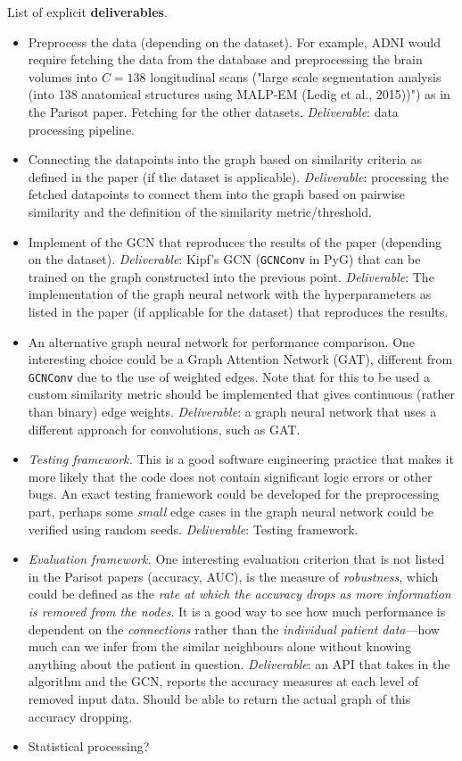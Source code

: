 \documentclass[12pt,a4paper,twoside]{article}
\begin{document}
List of explicit \textbf{deliverables}.
\begin{itemize}
  \item Preprocess the data (depending on the dataset). For example, ADNI would require fetching the data from the database and preprocessing the brain volumes into $C=138$ longitudinal scans ("large scale segmentation analysis (into 138 anatomical structures using MALP-EM (Ledig et al., 2015))") as in the Parisot paper. Fetching for the other datasets. \textit{Deliverable}: data processing pipeline.
  \item Connecting the datapoints into the graph based on similarity criteria as defined in the paper (if the dataset is applicable). \textit{Deliverable}: processing the fetched datapoints to connect them into the graph based on pairwise similarity and the definition of the similarity metric/threshold.
  \item Implement of the GCN that reproduces the results of the paper (depending on the dataset). \textit{Deliverable}: Kipf's GCN (\texttt{GCNConv} in PyG) that can be trained on the graph constructed into the previous point. \textit{Deliverable}: The implementation of the graph neural network with the hyperparameters as listed in the paper (if applicable for the dataset) that reproduces the results.
  \item An alternative graph neural network for performance comparison. One interesting choice could be a Graph Attention Network (GAT), different from \texttt{GCNConv} due to the use of weighted edges. Note that for this to be used a custom similarity metric should be implemented that gives continuous (rather than binary) edge weights. \textit{Deliverable}: a graph neural network that uses a different approach for convolutions, such as GAT.
  \item \textit{Testing framework.} This is a good software engineering practice that makes it more likely that the code does not contain significant logic errors or other bugs. An exact testing framework could be developed for the preprocessing part, perhaps some \textit{small} edge cases in the graph neural network could be verified using random seeds. \textit{Deliverable}: Testing framework.
  \item \textit{Evaluation framework.} One interesting evaluation criterion that is not listed in the Parisot papers (accuracy, AUC), is the measure of \textit{robustness}, which could be defined as the \textit{rate at which the accuracy drops as more information is removed from the nodes}. It is a good way to see how much performance is dependent on the \textit{connections} rather than the \textit{individual patient data}—how much can we infer from the similar neighbours alone without knowing anything about the patient in question. \textit{Deliverable}: an API that takes in the algorithm and the GCN, reports the accuracy measures at each level of removed input data. Should be able to return the actual graph of this accuracy dropping.
  \item Statistical processing?
\end{itemize}
\end{document}
